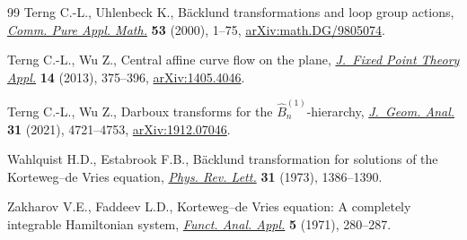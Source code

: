 \documentclass[pdftex]{sigma}
\numberwithin{equation}{section}
\begin{document}
\begin{thebibliography}{99}
Terng C.-L., Uhlenbeck K., B\"acklund transformations and loop group actions,
  \href{https://doi.org/10.1002/(SICI)1097-0312(200001)53:1<1::AID-CPA1>3.3.CO;2-L}{\textit{Comm. Pure Appl. Math.}} \textbf{53} (2000), 1--75,
  \href{https://arxiv.org/abs/math.DG/9805074}{arXiv:math.DG/9805074}.

Terng C.-L., Wu Z., Central affine curve flow on the plane, \href{https://doi.org/10.1007/s11784-014-0161-8}{\textit{J.~Fixed
  Point Theory Appl.}} \textbf{14} (2013), 375--396, \href{https://arxiv.org/abs/1405.4046}{arXiv:1405.4046}.

Terng C.-L., Wu Z., Darboux transforms for the {$\hat B_n^{(1)}$}-hierarchy,
  \href{https://doi.org/10.1007/s12220-020-00454-7}{\textit{J.~Geom. Anal.}} \textbf{31} (2021), 4721--4753, \href{https://arxiv.org/abs/1912.07046}{arXiv:1912.07046}.

Wahlquist H.D., Estabrook F.B., B\"acklund transformation for solutions of the
  {K}orteweg--de {V}ries equation, \href{https://doi.org/10.1103/PhysRevLett.31.1386}{\textit{Phys. Rev. Lett.}} \textbf{31}
  (1973), 1386--1390.

Zakharov V.E., Faddeev L.D., Korteweg--de {V}ries equation: {A} completely
  integrable {H}amiltonian system, \href{https://doi.org/10.1007/BF01086739}{\textit{Funct. Anal. Appl.}} \textbf{5}
  (1971), 280--287.

\end{thebibliography}\LastPageEnding
\end{document}
